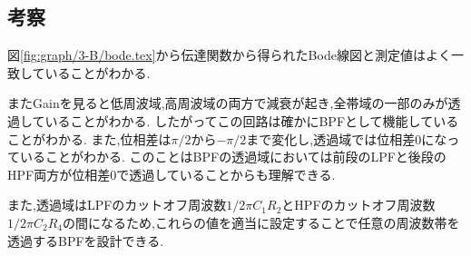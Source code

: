 \subsection{考察}
図\ref{fig:graph/3-B/bode.tex}から伝達関数から得られたBode線図と測定値はよく一致していることがわかる.

またGainを見ると低周波域,高周波域の両方で減衰が起き,全帯域の一部のみが透過していることがわかる.
したがってこの回路は確かにBPFとして機能していることがわかる.
また,位相差は$\pi/2$から$-\pi/2$まで変化し,透過域では位相差0になっていることがわかる.
このことはBPFの透過域においては前段のLPFと後段のHPF両方が位相差0で透過していることからも理解できる.

また,透過域はLPFのカットオフ周波数$1/2\pi C_1R_2$とHPFのカットオフ周波数$1/2\pi C_2R_4$の間になるため,これらの値を適当に設定することで任意の周波数帯を透過するBPFを設計できる.